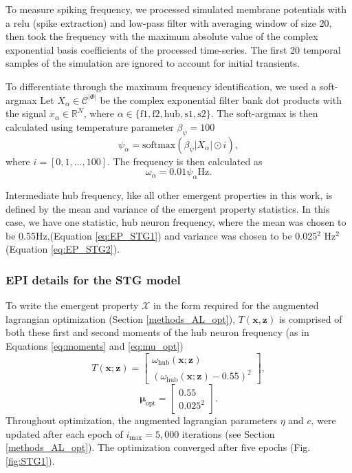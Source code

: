 \documentclass[11pt]{article}
\begin{document}
To measure spiking frequency, we processed simulated membrane potentials with a relu (spike extraction) and low-pass filter with averaging window of size 20, then took the frequency with the maximum absolute value of the complex exponential basis coefficients of the processed time-series.  The first 20 temporal samples of the simulation are ignored to account for initial transients.

To differentiate through the maximum frequency identification, we used a soft-argmax
Let $X_\alpha \in \mathcal{C}^{|\Phi|}$ be the complex exponential filter bank dot products with the signal $x_\alpha \in \mathbb{R}^{N}$, where $\alpha \in \{ \text{f1}, \text{f2}, \text{hub}, \text{s1}, \text{s2} \}$.  
The soft-argmax is then calculated using temperature parameter $\beta_{\psi}=100$
\begin{equation}
\psi_\alpha = \text{softmax}(\beta_{\psi}|X_\alpha|\odot i),
\end{equation}
where $i = [0, 1, ..., 100]$.
The frequency is then calculated as 
\begin{equation}
\omega_\alpha = 0.01\psi_\alpha \text{Hz}.
\end{equation}

Intermediate hub frequency, like all other emergent properties in this work, is defined by the mean and variance of the emergent property statistics.
In this case, we have one statistic, hub neuron frequency, where the mean was chosen to be 0.55Hz,(Equation \ref{eq:EP_STG1}) and variance was chosen to be 0.025$^2$ Hz$^2$ (Equation \ref{eq:EP_STG2}).

\subsubsection{EPI details for the STG model} \label{methods_stg_epi}
To write the emergent property $\mathcal{X}$ in the form required for the augmented lagrangian optimization (Section \ref{methods_AL_opt}), $T(\mathbf{x}, \mathbf{z})$ is comprised of both these first and second moments of the hub neuron frequency (as in Equations \ref{eq:moments} and \ref{eq:mu_opt})
\begin{equation} 
T(\mathbf{x}; \mathbf{z}) = \begin{bmatrix} \omega_{\text{hub}}(\mathbf{x}; \mathbf{z}) \\ \left( \omega_{\text{hub}}(\mathbf{x}; \mathbf{z}) - 0.55 \right)^2 \end{bmatrix},
\end{equation}
\begin{equation} 
\bm{\mu}_{\text{opt}} = \begin{bmatrix} 0.55 \\ 0.025^2 \end{bmatrix}.
\end{equation}
Throughout optimization, the augmented lagrangian parameters $\eta$ and $c$, were updated after each epoch of $i_{\text{max}} = 5,000$ iterations (see Section \ref{methods_AL_opt}).  
The optimization converged after five epochs (Fig. \ref{fig:STG1}).
\end{document}
